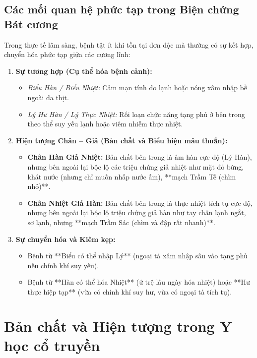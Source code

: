 \subsection{Các mối quan hệ phức tạp trong Biện chứng Bát cương}

Trong thực tế lâm sàng, bệnh tật ít khi tồn tại đơn độc mà thường có sự kết hợp, chuyển hóa phức tạp giữa các cương lĩnh:

\begin{enumerate}
    \item \textbf{Sự tương hợp (Cụ thể hóa bệnh cảnh):}
    \begin{itemize}
        \item \textit{Biểu Hàn / Biểu Nhiệt:} Cảm mạn tính do lạnh hoặc nóng xâm nhập bề ngoài da thịt.
        \item \textit{Lý Hư Hàn / Lý Thực Nhiệt:} Rối loạn chức năng tạng phủ ở bên trong theo thể suy yếu lạnh hoặc viêm nhiễm thực nhiệt.
    \end{itemize}

    \item \textbf{Hiện tượng Chân -- Giả (Bản chất và Biểu hiện mâu thuẫn):}
    \begin{itemize}
        \item \textbf{Chân Hàn Giả Nhiệt:} Bản chất bên trong là âm hàn cực độ (Lý Hàn), nhưng bên ngoài lại bộc lộ các triệu chứng giả nhiệt như mặt đỏ bừng, khát nước (nhưng chỉ muốn nhấp nước ấm), **mạch Trầm Tế (chìm nhỏ)**.
        \item \textbf{Chân Nhiệt Giả Hàn:} Bản chất bên trong là thực nhiệt tích tụ cực độ, nhưng bên ngoài lại bộc lộ triệu chứng giả hàn như tay chân lạnh ngắt, sợ lạnh, nhưng **mạch Trầm Sác (chìm và đập rất nhanh)**.
    \end{itemize}

    \item \textbf{Sự chuyển hóa và Kiêm kẹp:}
    \begin{itemize}
        \item Bệnh từ **Biểu có thể nhập Lý** (ngoại tà xâm nhập sâu vào tạng phủ nếu chính khí suy yếu).
        \item Bệnh từ **Hàn có thể hóa Nhiệt** (ứ trệ lâu ngày hóa nhiệt) hoặc **Hư thực hiệp tạp** (vừa có chính khí suy hư, vừa có ngoại tà tích tụ).
    \end{itemize}
\end{enumerate}


\section{Bản chất và Hiện tượng trong Y học cổ truyền}


